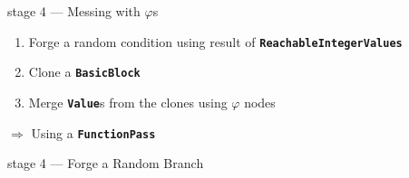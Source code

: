 \documentclass[14pt]{beamer}
\newcommand{\Code}[1]{\textbf{\texttt{#1}}}
\begin{document}
    \begin{frame}{stage 4 --- Messing with $\varphi$s}
        \begin{enumerate}
            \item Forge a random condition using result of \Code{ReachableIntegerValues}
            \item Clone a \Code{BasicBlock}
            \item Merge \Code{Value}s from the clones using $\varphi$ nodes
        \end{enumerate}
        $\Rightarrow$ Using a \Code{FunctionPass}
    \end{frame}

    \begin{frame}[containsverbatim]{stage 4 --- Forge a Random Branch}

        \\
        \begin{minipage}{\textwidth}
        \scriptsize
        
        \end{minipage}

        \\
        \hspace{-2em}%
        \begin{minipage}{\textwidth}
        \scriptsize
        
        \end{minipage}

        \\
        \begin{minipage}{\textwidth}
        \scriptsize
        
        \end{minipage}
    \end{frame}
\end{document}
